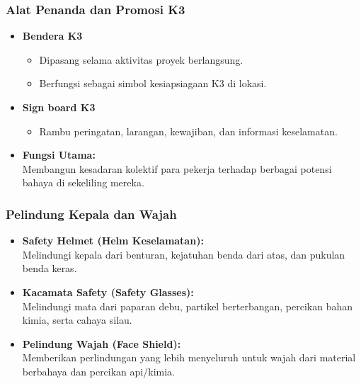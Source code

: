 \documentclass[../main.tex]{subfiles}
\begin{document}
\begin{frame}[t, mytitle=standard, mycolor=digiPH_cream]
	\frametitle{Alat Penanda dan Promosi K3}
	\begin{itemize}
		\item \textbf{Bendera K3}
		      \begin{itemize}
			      \item Dipasang selama aktivitas proyek berlangsung.
			      \item Berfungsi sebagai simbol kesiapsiagaan K3 di lokasi.
		      \end{itemize}
		      \vspace{0.3cm}
		\item \textbf{Sign board K3}
		      \begin{itemize}
			      \item Rambu peringatan, larangan, kewajiban, dan informasi keselamatan.
		      \end{itemize}
		      \vspace{0.3cm}
		\item \textbf{Fungsi Utama:} \\ Membangun kesadaran kolektif para pekerja terhadap berbagai potensi bahaya di sekeliling mereka.
	\end{itemize}
\end{frame}

\begin{frame}[c, mytitle=standard]
	\frametitle{Pelindung Kepala dan Wajah}
	\begin{itemize}
		\item \textbf{Safety Helmet (Helm Keselamatan):} \\ Melindungi kepala dari benturan, kejatuhan benda dari atas, dan pukulan benda keras.
		\item \textbf{Kacamata Safety (Safety Glasses):} \\ Melindungi mata dari paparan debu, partikel berterbangan, percikan bahan kimia, serta cahaya silau.
		\item \textbf{Pelindung Wajah (Face Shield):} \\ Memberikan perlindungan yang lebih menyeluruh untuk wajah dari material berbahaya dan percikan api/kimia.
	\end{itemize}
\end{frame}
\end{document}
